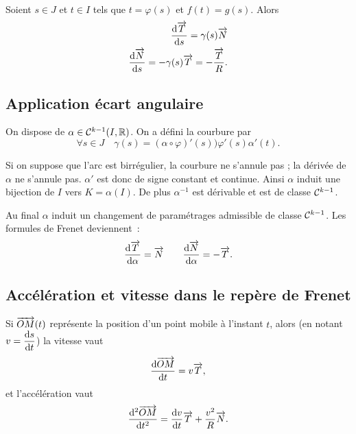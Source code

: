   Soient \(s \in J\) et \(t \in I\) tels que \(t=\varphi(s)\) et \(f(t)=g(s)\).
  Alors
  \begin{align}
    \dfrac{\mathrm{d} \overrightarrow{T}}{\mathrm{d} s} = \gamma(s) \overrightarrow{N} \\
    \dfrac{\mathrm{d} \overrightarrow{N}}{\mathrm{d} s} = -\gamma(s)\overrightarrow{T}=-\frac{\overrightarrow{T}}{R}.
  \end{align}

  \subsection{Application écart angulaire}

  On dispose de \(\alpha \in \mathcal{C}^{k-1}(I, \mathbb{R})\). On a défini la courbure par
  \begin{equation}
    \forall s \in J \quad \gamma(s) = (\alpha \circ \varphi)'(s) )
    \varphi'(s)\alpha'(t).
  \end{equation}

  Si on suppose que l'arc est birrégulier, la courbure ne s'annule pas ; la
  dérivée de \(\alpha\) ne s'annule pas. \(\alpha'\) est donc de signe constant
  et continue. Ainsi \(\alpha\) induit une bijection de \(I\) vers
  \(K=\alpha(I)\). De plus \(\alpha^{-1}\) est dérivable et est de classe
  \(\mathcal{C}^{k-1}\).

  Au final \(\alpha\) induit un changement de paramétrages admissible de classe
  \(\mathcal{C}^{k-1}\). Les formules de Frenet deviennent~:
  \begin{equation}
    \dfrac{\mathrm{d} \overrightarrow{T}}{\mathrm{d} \alpha}=\overrightarrow{N} \qquad
    \dfrac{\mathrm{d} \overrightarrow{N}}{\mathrm{d} \alpha}=-\overrightarrow{T}.
  \end{equation}

  \subsection{Accélération et vitesse dans le repère de Frenet}

  Si \(\overrightarrow{OM}(t)\) représente la position d'un point mobile à l'instant
  \(t\), alors (en notant\(v=\dfrac{\mathrm{d} s}{\mathrm{d} t}\)) la vitesse vaut
  \begin{equation}
    \dfrac{\mathrm{d} \overrightarrow{OM}}{\mathrm{d} t} = v \overrightarrow{T},
  \end{equation}
  et l'accélération vaut
  \begin{equation}
    \dfrac{\mathrm{d}^2 \overrightarrow{OM}}{\mathrm{d} {t}^2} = \dfrac{\mathrm{d} v}{\mathrm{d} t} \overrightarrow{T} + \frac{v^2}{R} \overrightarrow{N}.
  \end{equation}
